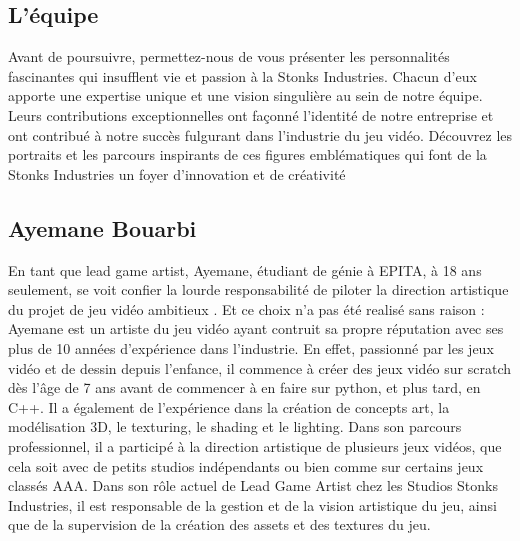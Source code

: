 \subsection{L'équipe}

Avant de poursuivre, permettez-nous de vous présenter les personnalités fascinantes qui insufflent vie et passion à la Stonks Industries. 
Chacun d'eux apporte une expertise unique et une vision singulière au sein de notre équipe.
 Leurs contributions exceptionnelles ont façonné l'identité de notre entreprise et ont contribué à notre succès fulgurant dans l'industrie du jeu vidéo. 
 Découvrez les portraits et les parcours inspirants de ces figures emblématiques qui font de la Stonks Industries un foyer d'innovation et de créativité

 \subsection*{Ayemane Bouarbi} 
En tant que lead game artist, Ayemane, étudiant de génie à EPITA, à 18 ans seulement,
se voit confier la lourde responsabilité de piloter la direction artistique du projet de jeu vidéo
ambitieux \gameName. Et ce choix n'a pas été realisé sans raison : Ayemane est un artiste
du jeu vidéo ayant contruit sa propre réputation avec ses plus de 10 années d'expérience dans
l'industrie. En effet, passionné par les jeux vidéo et de dessin depuis l'enfance, il commence à
créer des jeux vidéo sur scratch dès l'âge de 7 ans avant de commencer à en faire sur python,
et plus tard, en C++. Il a également de l'expérience dans la création de concepts art, la
modélisation 3D, le texturing, le shading et le lighting. Dans son parcours professionnel, il a
participé à la direction artistique de plusieurs jeux vidéos, que cela soit avec de petits studios
indépendants ou bien comme sur certains jeux classés AAA. Dans son rôle actuel de Lead
Game Artist chez les Studios Stonks Industries, il est responsable de la gestion et de la vision
artistique du jeu, ainsi que de la supervision de la création des assets et des textures du jeu.
\\

